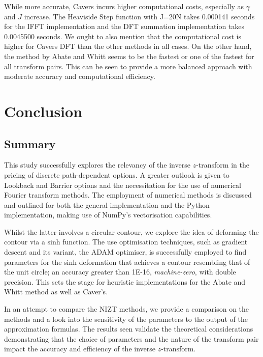 \documentclass[a4paper]{report}
\begin{document}
While more accurate, Cavers incurs higher computational costs, especially as $\gamma$ and $J$ increase. The Heaviside Step function with J=20N takes 0.000141 seconds for the IFFT implementation and the DFT summation implementation takes 0.0045500 seconds. We ought to also mention that the computational cost is higher for Cavers DFT than the other methods in all cases. On the other hand, the method by Abate and Whitt seems to be the fastest or one of the fastest for all transform pairs. This can be seen to provide a more balanced approach with moderate accuracy and computational efficiency.

\chapter{Conclusion}

\section{Summary}
This study successfully explores the relevancy of the inverse $z$-transform in the pricing of discrete path-dependent options. A greater outlook is given to Lookback and Barrier options and the necessitation for the use of numerical Fourier transform methods. The employment of numerical methods is discussed and outlined for both the general implementation and the Python implementation, making use of NumPy's vectorisation capabilities. 

Whilst the latter involves a circular contour, we explore the idea of deforming the contour via a sinh function. The use optimisation techniques, such as gradient descent and its variant, the ADAM optimiser, is successfully employed to find parameters for the sinh deformation that achieves a contour resembling that of the unit circle; an accuracy greater than 1E-16, \textit{machine-zero}, with double precision. This sets the stage for heuristic implementations for the Abate and Whitt method as well as Caver's.

In an attempt to compare the NIZT methods, we provide a comparison on the methods and a look into the sensitivity of the parameters to the output of the approximation formulas. The results seen validate the theoretical considerations demonstrating that the choice of parameters and the nature of the transform pair impact the accuracy and efficiency of the inverse $z$-transform.
\end{document}
